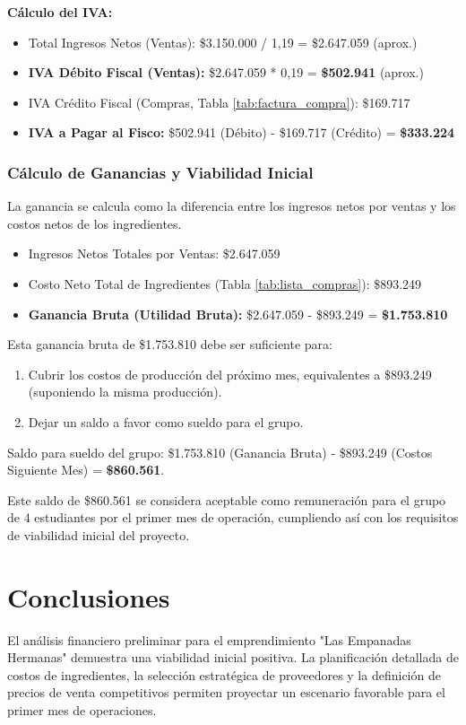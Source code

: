 \documentclass[12pt]{article}
\begin{document}
        \textbf{Cálculo del IVA:}
        \begin{itemize}
            \item Total Ingresos Netos (Ventas): \$3.150.000 / 1,19 = \$2.647.059 (aprox.)
            \item \textbf{IVA Débito Fiscal (Ventas):} \$2.647.059 * 0,19 = \textbf{\$502.941} (aprox.)
            \item IVA Crédito Fiscal (Compras, Tabla \ref{tab:factura_compra}): \$169.717
            \item \textbf{IVA a Pagar al Fisco:} \$502.941 (Débito) - \$169.717 (Crédito) = \textbf{\$333.224}
        \end{itemize}
        
    \subsubsection{Cálculo de Ganancias y Viabilidad Inicial}
    La ganancia se calcula como la diferencia entre los ingresos netos por ventas y los costos netos de los ingredientes.

    \begin{itemize}
        \item Ingresos Netos Totales por Ventas: \$2.647.059
        \item Costo Neto Total de Ingredientes (Tabla \ref{tab:lista_compras}): \$893.249
        \item \textbf{Ganancia Bruta (Utilidad Bruta):} \$2.647.059 - \$893.249 = \textbf{\$1.753.810}
    \end{itemize}

    Esta ganancia bruta de \$1.753.810 debe ser suficiente para:
    \begin{enumerate}
        \item Cubrir los costos de producción del próximo mes, equivalentes a \$893.249 (suponiendo la misma producción).
        \item Dejar un saldo a favor como sueldo para el grupo.
    \end{enumerate}
    Saldo para sueldo del grupo: \$1.753.810 (Ganancia Bruta) - \$893.249 (Costos Siguiente Mes) = \textbf{\$860.561}.

    Este saldo de \$860.561 se considera aceptable como remuneración para el grupo de 4 estudiantes por el primer mes de operación, cumpliendo así con los requisitos de viabilidad inicial del proyecto.

    \newpage


\section{Conclusiones} %
El análisis financiero preliminar para el emprendimiento "Las Empanadas Hermanas" demuestra una viabilidad inicial positiva. La planificación detallada de costos de ingredientes, la selección estratégica de proveedores y la definición de precios de venta competitivos permiten proyectar un escenario favorable para el primer mes de operaciones.
\end{document}
